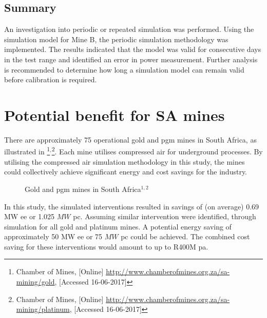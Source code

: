 	\subsection{Summary}
	An investigation into periodic or repeated simulation was performed. Using the simulation model for Mine B, the periodic simulation methodology was implemented. The results indicated that the model was valid for consecutive days in the test range and identified an error in power measurement. Further analysis is recommended to determine how long a simulation model can remain valid before calibration is required.
\section{Potential benefit for SA mines}
There are approximately 75 operational gold and \gls{pgm} mines in South Africa, as illustrated in  \footnote{ Chamber of Mines, [Online] \url{http://www.chamberofmines.org.za/sa-mining/gold}, [Accessed 16-06-2017]}$^,$\footnote{ Chamber of Mines, [Online] \url{http://www.chamberofmines.org.za/sa-mining/platinum}, [Accessed 16-06-2017]}. Each mine utilises compressed air for underground processes. By utilising the compressed air simulation methodology in this study, the mines could collectively achieve significant energy and cost savings for the industry. 
\par 
	\begin{figure}[h!]
		\centering
		\caption[Gold and Platinum group metal mines in South Africa]{Gold and \gls{pgm} mines in South Africa$^{1,2}$}
		\label{fig: Mine map}
	\end{figure}
In this study, the simulated interventions resulted in savings of (on average) 0.69 MW \gls{ee} or 1.025 $ MW $ \gls{pc}. Assuming similar intervention were identified, through simulation for all gold and platinum mines. A potential energy saving of approximately 50 MW \gls{ee} or 75 $ MW $ \gls{pc} could be achieved. The combined cost saving for these interventions would amount to up to R400M \gls{pa}.
\clearpage
